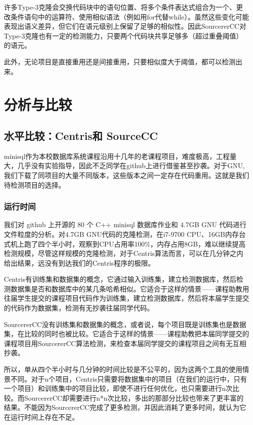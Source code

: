\documentclass{cjc}
\begin{document}
许多Type-3克隆会交换代码块中的语句位置、将多个条件表达式组合为一个、更改条件语句中的运算符、使用相似语法（例如用for代替while）。虽然这些变化可能表现出语义差异，但它们在语元级别上保留了足够的相似性。因此SourcererCC对Type-3克隆也有一定的检测能力，只要两个代码块共享足够多（超过重叠阈值）的语元。

此外，无论项目是直接重用还是间接重用，只要相似度大于阈值，都可以检测出来。

\section{分析与比较}

\subsection{水平比较：Centris和 SourceCC}

minisql作为本校数据库系统课程沿用十几年的老课程项目，难度极高，工程量大，几乎没有实验指导，因此不乏同学在github上进行借鉴甚至抄袭。对于GNU,我们下载了同项目的大量不同版本，这些版本之间一定存在代码重用。这就是我们待检测项目的选择。

\subsubsection{运行时间}

我们对 github 上开源的 80 个 C++ minisql 数据库作业和 4.7GB GNU 代码进行文件粒度的分析。对4.7GB GNU代码的克隆检测，在i7-9700 CPU、16GB内存台式机上跑了四个半小时，观察到CPU占用率100\%，内存占用8GB，难以继续提高检测规模，尽管这样规模的克隆检测，对于Centris算法而言，可以在几分钟之内给出结果，远没有到达我们的Centris程序的极限。

Centris有训练集和数据集的概念，它通过输入训练集，建立检测数据库，然后检测数据集是否和数据库中的某几条哈希相似。它适合于这样的情景——课程助教用往届学生提交的课程项目代码作为训练集，建立检测数据库，然后将本届学生提交的代码作为数据集，检测有无抄袭往届同学代码。

SourcererCC没有训练集和数据集的概念，或者说，每个项目既是训练集也是数据集，在比较的同时也被比较。它适合于这样的情景——课程助教把本届同学提交的课程项目用SourcererCC算法检测，来检查本届同学提交的课程项目之间有无互相抄袭。

所以，单从四个半小时与几分钟的时间比较是不公平的，因为这两个工具的使用情景不同。对于n个项目，Centris只需要将数据集中的项目（在我们的运行中，只有一个项目）和训练集中的项目比较，即使不进行任何优化，也只需要进行n次比较。而SourcererCC却需要进行n*n次比较，多出的那部分比较也带来了更丰富的结果。不能因为SourcererCC完成了更多检测，并因此消耗了更多时间，就认为它在运行时间上存在不足。
\end{document}
